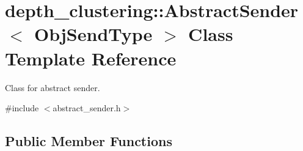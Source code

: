 \hypertarget{classdepth__clustering_1_1AbstractSender}{\section{depth\-\_\-clustering\-:\-:Abstract\-Sender$<$ Obj\-Send\-Type $>$ Class Template Reference}
\label{classdepth__clustering_1_1AbstractSender}
}


Class for abstract sender.  




{\ttfamily \#include $<$abstract\-\_\-sender.\-h$>$}

\subsection*{Public Member Functions}
